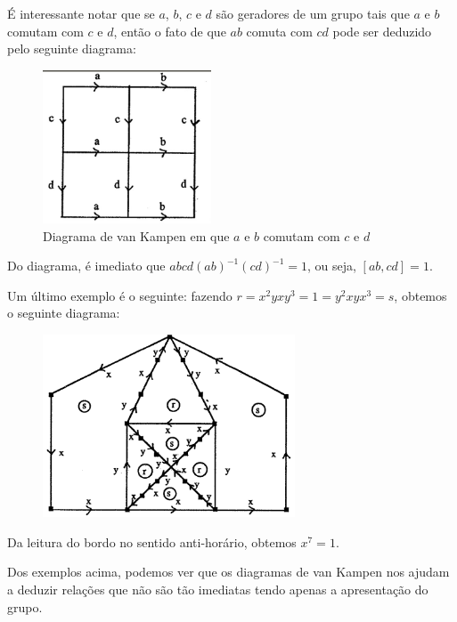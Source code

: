 	\par\vspace{0.3cm} É interessante notar que se $a$, $b$, $c$ e $d$ são geradores de um grupo 
	tais que $a$ e $b$ comutam com $c$ e $d$, então o fato de que $ab$ comuta com $cd$ pode ser 
	deduzido pelo seguinte diagrama:
	\begin{figure}[H]
	\begin{center}
		\includegraphics[width=5cm]{Images/diagrama_comutatividade.png}
	\end{center}
	\caption{Diagrama de van Kampen em que $a$ e $b$ comutam com $c$ e $d$}
	\label{figura diagrama comutatividade}
	\end{figure}
	Do diagrama, é imediato que $abcd(ab)^{-1}(cd)^{-1} = 1$, ou seja, $[ab,cd] = 1$.
	
	\par\vspace{0.3cm} Um último exemplo é o seguinte: fazendo $r = x^2yxy^3 = 1 = y^2xyx^3 = s$, 
	obtemos o seguinte diagrama:
	\begin{figure}[H]
	\begin{center}
		\includegraphics[width=7.5cm]{Images/diagrama_complicado.png}
	\end{center}
	\end{figure}
	Da leitura do bordo no sentido anti-horário, obtemos $x^7=1$.
	
	\par\vspace{0.3cm} Dos exemplos acima, podemos ver que os diagramas de van Kampen nos ajudam 
	a deduzir relações que não são tão imediatas tendo apenas a apresentação do grupo.
	
